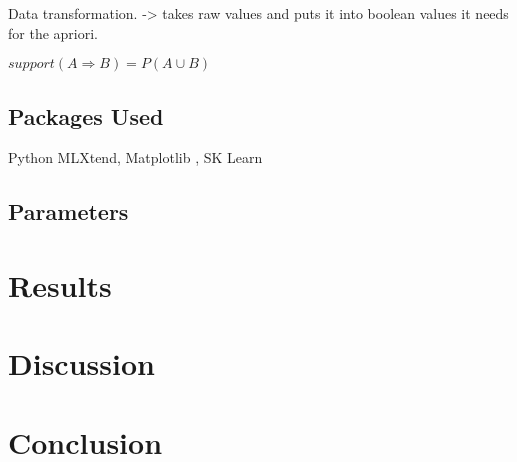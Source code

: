 \documentclass[a4paper,10pt]{article}
\begin{document}
Data transformation. -> takes raw values and puts it into boolean values it needs for the apriori.

$support(A \Rightarrow B) = P(A \cup B)$

\subsection{Packages Used}

Python\cite{Python} MLXtend\cite{raschkas_2018_mlxtend}, Matplotlib \cite{hunter2007matplotlib}, SK Learn\cite{scikit-learn, sklearn_api}



\subsection{Parameters}

\section{Results}


\section{Discussion}



\section{Conclusion}



\medskip
\newpage


\end{document}
